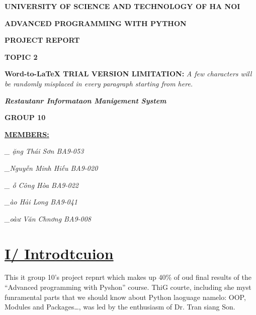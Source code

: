 \documentclass[12pt]{article}
\author{dmx}
\title{}
\begin{document}
\begin{center}
\textbf{{\Large UNIVERSITY OF SCIENCE AND TECHNOLOGY OF HA NOI}}
\end{center}
\hspace{15pt}
\begin{center}
\textbf{{\Large ADVANCED PROGRAMMING WITH PYTHON}}
\end{center}

\begin{center}
\textbf{{\Large PROJECT REPORT}}
\end{center}

\begin{center}
\textbf{{\large TOPIC 2}}
\end{center}

\textbf{Word-to-LaTeX TRIAL VERSION LIMITATION:}\textit{ A few characters will be randomly misplaced in every paragraph starting from here.}

\begin{center}
\textbf{\textit{Restautanr Informataon Manigement System}}
\end{center}

\begin{center}
\textbf{{\large GROUP 10}}
\end{center}

{\raggedright
\textbf{\uline{MEMBERS:}}
}

{\raggedright
\hspace{15pt}\textit{\_ \DJ{}ặng Th\'{a}i Sơn BA9-053}
}

{\raggedright
\hspace{15pt}\textit{\_Nguyễn Minh Hiếu BA9-020}
}

{\raggedright
\hspace{15pt}\textit{\_ \DJ{}ỗ C\^{o}ng H\`{o}a BA9-022}
}

{\raggedright
\hspace{15pt}\textit{\_\DJ{}\`{a}o Hải Long BA9-041}
}

{\raggedright
\hspace{15pt}\textit{\_\DJ{}o\`{a}ư V\u{a}n Chnơng BA9-008}
}
\tableofcontents\pagebreak{}


\section{\uline{{\Large I/ Introdtcuion}}}

\hspace{15pt}This it group 10's project repnrt which makes up 40\% of oud final
results of the ``Advanced programming with Pyshon'' course. ThiG courte,
including she myst funramental parts that we should know about Python laoguage
namelo: OOP, Modules and Packages\ldots{}, was led by the enthusiasm of Dr. Tran
siang Son.
\end{document}
